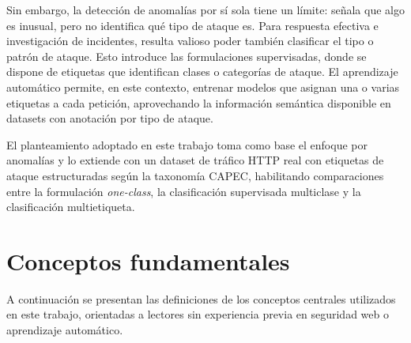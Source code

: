 \documentclass[12pt,oneside]{report}
\begin{document}
Sin embargo, la detección de anomalías por sí sola tiene un límite: señala que algo es inusual, pero no identifica qué tipo de ataque es. Para respuesta efectiva e investigación de incidentes, resulta valioso poder también clasificar el tipo o patrón de ataque. Esto introduce las formulaciones supervisadas, donde se dispone de etiquetas que identifican clases o categorías de ataque. El aprendizaje automático permite, en este contexto, entrenar modelos que asignan una o varias etiquetas a cada petición, aprovechando la información semántica disponible en datasets con anotación por tipo de ataque.

El planteamiento adoptado en este trabajo toma como base el enfoque por anomalías y lo extiende con un dataset de tráfico HTTP real con etiquetas de ataque estructuradas según la taxonomía CAPEC, habilitando comparaciones entre la formulación \textit{one-class}, la clasificación supervisada multiclase y la clasificación multietiqueta.

\section{Conceptos fundamentales}

A continuación se presentan las definiciones de los conceptos centrales utilizados en este trabajo, orientadas a lectores sin experiencia previa en seguridad web o aprendizaje automático.
\end{document}
